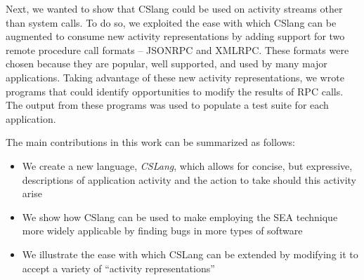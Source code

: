Next, we wanted to
show that CSlang
could be used on activity streams
other than system calls.
To do so,
we exploited the ease with which
CSlang can be augmented
to consume new activity representations
by adding support for two remote procedure call formats -- JSONRPC and XMLRPC.
These formats were chosen
because they are popular,
well supported, and
used by many major applications.
Taking advantage of these new activity representations,
we wrote programs
that could identify opportunities
to modify the results of RPC calls.
The output from these programs was used to populate a test suite
for each application.

The main contributions in this work can be summarized as follows:

\begin{itemize}

\item{We create a new language, {\em CSLang},
  which allows for concise, but expressive, descriptions of
    application activity and the action to take should this activity arise}

\item{We show how CSlang can be used to make employing the SEA technique
  more widely applicable by finding bugs in more types of software}

\item{We illustrate the ease with which CSLang can be extended by modifying
  it to accept a variety of ``activity representations''}

\end{itemize}

